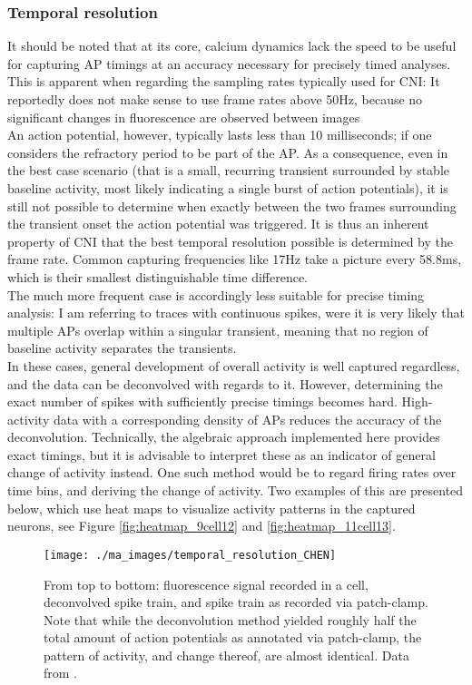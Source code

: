 \documentclass[titlepage]{article}
\begin{document}
\subsubsection{Temporal resolution}\label{temp}
It should be noted that at its core, calcium dynamics lack the speed to be useful for capturing AP timings at an accuracy necessary for precisely timed analyses.\\
This is apparent when regarding the sampling rates typically used for CNI: It reportedly does not make sense to use frame rates above 50Hz, because no significant changes in fluorescence are observed between images\cite{orbach_optical_1985}\\
An action potential, however, typically lasts less than 10 milliseconds; if one considers the refractory period to be part of the AP\cite{nover_lehrbuch_2005}.
As a consequence, even in the best case scenario (that is a small, recurring transient surrounded by stable baseline activity, most likely indicating a single burst of action potentials), it is still not possible to determine when exactly between the two frames surrounding the transient onset the action potential was triggered. It is thus an inherent property of CNI that the best temporal resolution possible is determined by the frame rate. Common capturing frequencies like 17Hz take a picture every 58.8ms, which is their smallest distinguishable time difference.\\
The much more frequent case is accordingly less suitable for precise timing analysis: I am referring to traces with continuous spikes, were it is very likely that multiple APs overlap within a singular transient, meaning that no region of baseline activity separates the transients.\\
In these cases, general development of overall activity is well captured regardless, and the data can be deconvolved with regards to it. However, determining the exact number of spikes with sufficiently precise timings becomes hard. High-activity data with a corresponding density of APs reduces the accuracy of the deconvolution.
Technically, the algebraic approach implemented here provides exact timings, but it is advisable to interpret these as an indicator of general change of activity instead. One such method would be to regard firing rates over time bins, and deriving the change of activity.  Two examples of this are presented below, which use heat maps to visualize activity patterns in the captured neurons, see Figure \ref{fig:heatmap_9cell12} and \ref{fig:heatmap_11cell13}.
\begin{figure}[h]
\centering
\texttt{[image: ./ma\_images/temporal\_resolution\_CHEN]}
\caption{From top to bottom: fluorescence signal recorded in a cell, deconvolved spike train, and spike train as recorded via patch-clamp. Note that while the deconvolution method yielded roughly half the total amount of action potentials as annotated via patch-clamp, the pattern of activity, and change thereof, are almost identical. Data from \citeauthor{chen_ultrasensitive_2013}\cite{chen_ultrasensitive_2013}.}
\label{fig:temporal_resolution_CHEN}
\end{figure}
\end{document}
